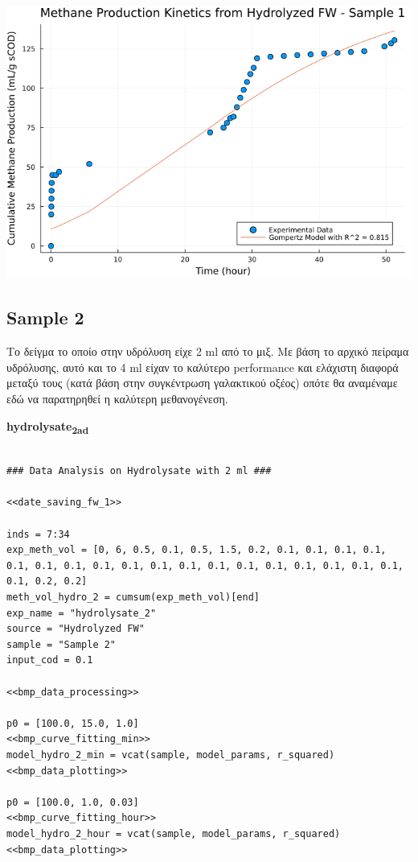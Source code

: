 \documentclass[11pt]{article}
\begin{document}
\begin{center}
\includegraphics[width=.9\linewidth]{../plots/BMPs/Hydrolyzed FW/methane_kinetics_hydrolysate_1_hour.png}
\end{center}

\subsection{Sample 2}
\label{sec:orgd7a7b10}
Το δείγμα το οποίο στην υδρόλυση είχε 2 ml από το μιξ. Με βάση το αρχικό πείραμα υδρόλυσης, αυτό και το 4 ml είχαν το καλύτερο performance και ελάχιστη διαφορά μεταξύ τους (κατά βάση στην συγκέντρωση γαλακτικού οξέος) οπότε θα αναμέναμε εδώ να παρατηρηθεί η καλύτερη μεθανογένεση.

\textbf{hydrolysate\textsubscript{2}\textsubscript{ad}}
\begin{verbatim}

### Data Analysis on Hydrolysate with 2 ml ###

<<date_saving_fw_1>>

inds = 7:34
exp_meth_vol = [0, 6, 0.5, 0.1, 0.5, 1.5, 0.2, 0.1, 0.1, 0.1, 0.1, 0.1, 0.1, 0.1, 0.1, 0.1, 0.1, 0.1, 0.1, 0.1, 0.1, 0.1, 0.1, 0.1, 0.1, 0.1, 0.2, 0.2]
meth_vol_hydro_2 = cumsum(exp_meth_vol)[end]
exp_name = "hydrolysate_2"
source = "Hydrolyzed FW"
sample = "Sample 2"
input_cod = 0.1

<<bmp_data_processing>>

p0 = [100.0, 15.0, 1.0]
<<bmp_curve_fitting_min>>
model_hydro_2_min = vcat(sample, model_params, r_squared)
<<bmp_data_plotting>>

p0 = [100.0, 1.0, 0.03]
<<bmp_curve_fitting_hour>>
model_hydro_2_hour = vcat(sample, model_params, r_squared)
<<bmp_data_plotting>>
\end{verbatim}
\end{document}
